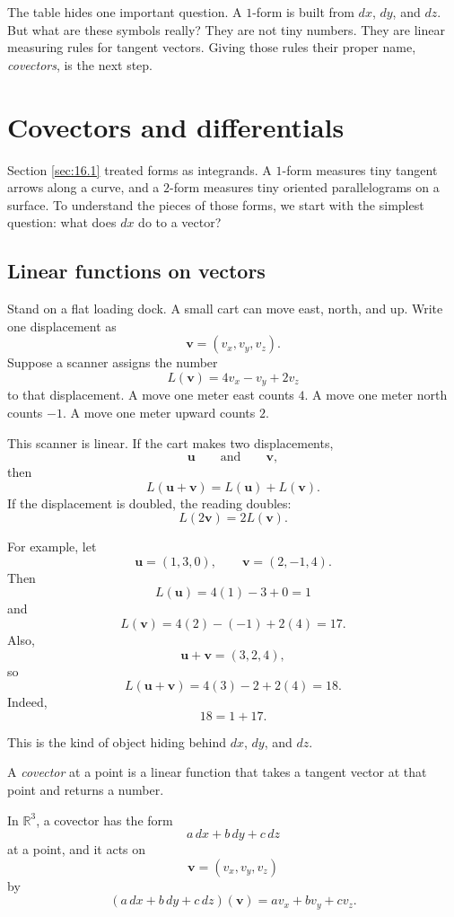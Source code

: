The table hides one important question.  A \(1\)-form is built from \(dx\), \(dy\), and
\(dz\).  But what are these symbols really?  They are not tiny numbers.  They are
linear measuring rules for tangent vectors.  Giving those rules their proper name,
\emph{covectors}, is the next step.

\section{Covectors and differentials}
\label{sec:16.2}

Section \ref{sec:16.1} treated forms as integrands.  A \(1\)-form measures tiny tangent
arrows along a curve, and a \(2\)-form measures tiny oriented parallelograms on a
surface.  To understand the pieces of those forms, we start with the simplest question:
what does \(dx\) do to a vector?

\subsection{Linear functions on vectors}

Stand on a flat loading dock.  A small cart can move east, north, and up.  Write one
displacement as
\[
    \mathbf v=(v_x,v_y,v_z).
\]
Suppose a scanner assigns the number
\[
    L(\mathbf v)=4v_x-v_y+2v_z
\]
to that displacement.  A move one meter east counts \(4\).  A move one meter north
counts \(-1\).  A move one meter upward counts \(2\).

This scanner is linear.  If the cart makes two displacements,
\[
    \mathbf u
    \qquad\text{and}\qquad
    \mathbf v,
\]
then
\[
    L(\mathbf u+\mathbf v)=L(\mathbf u)+L(\mathbf v).
\]
If the displacement is doubled, the reading doubles:
\[
    L(2\mathbf v)=2L(\mathbf v).
\]

For example, let
\[
    \mathbf u=(1,3,0),
    \qquad
    \mathbf v=(2,-1,4).
\]
Then
\[
    L(\mathbf u)=4(1)-3+0=1
\]
and
\[
    L(\mathbf v)=4(2)-(-1)+2(4)=17.
\]
Also,
\[
    \mathbf u+\mathbf v=(3,2,4),
\]
so
\[
    L(\mathbf u+\mathbf v)=4(3)-2+2(4)=18.
\]
Indeed,
\[
    18=1+17.
\]

This is the kind of object hiding behind \(dx\), \(dy\), and \(dz\).

\begin{definition}[Covector]
A \emph{covector} at a point is a linear function that takes a tangent vector at that
point and returns a number.

In \(\mathbb R^3\), a covector has the form
\[
    a\,dx+b\,dy+c\,dz
\]
at a point, and it acts on
\[
    \mathbf v=(v_x,v_y,v_z)
\]
by
\[
\boxed{
    (a\,dx+b\,dy+c\,dz)(\mathbf v)
    =
    av_x+bv_y+cv_z.
}
\]
\end{definition}

